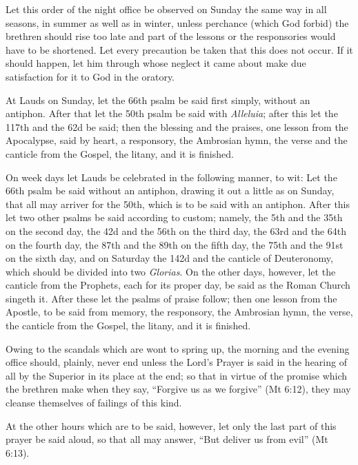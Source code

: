 Let this order of the night office be observed on Sunday the same way in all seasons, in summer as well as in winter, unless perchance (which God forbid) the brethren should rise too late and part of the lessons or the responsories would have to be shortened. Let every precaution be taken that this does not occur. If it should happen, let him through whose neglect it came about make due satisfaction for it to God in the oratory.


At Lauds on Sunday, let the 66th psalm be said first simply, without an antiphon. After that let the 50th psalm be said with \emph{Alleluia}; after this let the 117th and the 62d be said; then the blessing and the praises, one lesson from the Apocalypse, said by heart, a responsory, the Ambrosian hymn, the verse and the canticle from the Gospel, the litany, and it is finished.


On week days let Lauds be celebrated in the following manner, to wit: Let the 66th psalm be said without an antiphon, drawing it out a little as on Sunday, that all may arriver for the 50th, which is to be said with an antiphon. After this let two other psalms be said according to custom; namely, the 5th and the 35th on the second day, the 42d and the 56th on the third day, the 63rd and the 64th on the fourth day, the 87th and the 89th on the fifth day, the 75th and the 91st on the sixth day, and on Saturday the 142d and the canticle of Deuteronomy, which should be divided into two \emph{Glorias}. On the other days, however, let the canticle from the Prophets, each for its proper day, be said as the Roman Church singeth it. After these let the psalms of praise follow; then one lesson from the Apostle, to be said from memory, the responsory, the Ambrosian hymn, the verse, the canticle from the Gospel, the litany, and it is finished.

Owing to the scandals which are wont to spring up, the morning and the evening office should, plainly, never end unless the Lord's Prayer is said in the hearing of all by the Superior in its place at the end; so that in virtue of the promise which the brethren make when they say, ``Forgive us as we forgive'' (Mt 6:12), they may cleanse themselves of failings of this kind.

At the other hours which are to be said, however, let only the last part of this prayer be said aloud, so that all may answer, ``But deliver us from evil'' (Mt 6:13).

